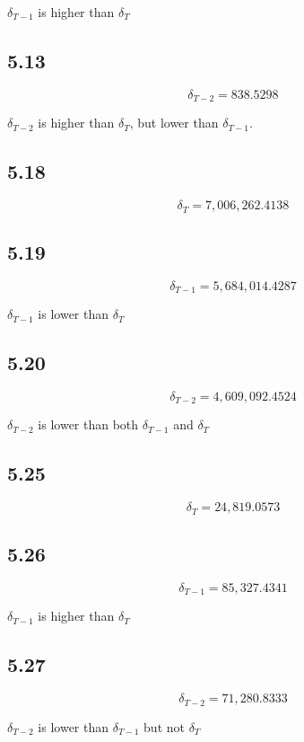 \documentclass[letterpaper,12pt]{article}
\theoremstyle{definition}
\begin{document}
$\delta_{T-1}$ is higher than $\delta_{T}$

\subsection*{5.13}

\[\delta_{T-2} = 838.5298 \]

$\delta_{T-2}$ is higher than $\delta_{T}$, but lower than $\delta_{T-1}$.

\subsection*{5.18}

\[ \delta_T = 7,006,262.4138 \]

\subsection*{5.19}

\[ \delta_{T-1} = 5,684,014.4287 \]

$\delta_{T-1}$ is lower than $\delta_{T}$

\subsection*{5.20}

\[ \delta_{T-2} = 4,609,092.4524 \]

$\delta_{T-2}$ is lower than both $\delta_{T-1}$ and $\delta_{T}$

\subsection*{5.25}

\[ \delta_T = 24,819.0573 \]

\subsection*{5.26}

\[ \delta_{T-1} = 85,327.4341 \]

$\delta_{T-1}$ is higher than $\delta_{T}$

\subsection*{5.27}

\[ \delta_{T-2} = 71,280.8333 \]

$\delta_{T-2}$ is lower than $\delta_{T-1}$ but not $\delta_{T}$
\end{document}
